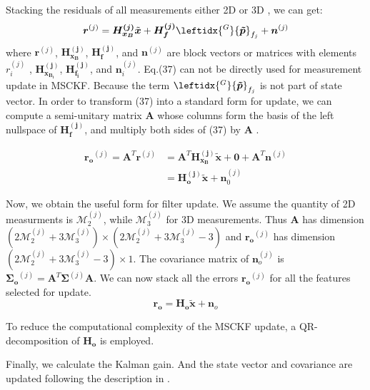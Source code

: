 \documentclass[a4paper, 10pt, conference]{ieeeconf}      %
\begin{document}
Stacking the residuals
of all measurements either 2D or 3D , we can get:
\begin{equation}
\bm {r}^{(j)} =\bm{H_{x_{B}}^{(j)}}{\tilde {\bm x}}+\bm{H_{f}^{(j)}}{\leftidx{^{G}}{\bm {\tilde p}}_{f_{j}}}+{\bm n^{(j)}}
\end{equation}
where $ \bm {r}^{(j)} $, $ \bm{H_{x_{B}}^{(j)}} $, $ \bm{H_{f}^{(j)}} $, and $ {\bm n^{(j)}} $ are block vectors or matrices with elements $ {r}_i^{(j)} $ , $ \bm{H_{x_{B_i}}^{(j)}} $, $ \bm{H_{f_{i}}^{(j)}} $, and $ {\bm n_i^{(j)}} $. Eq.(37) can not be directly used for measurement update in MSCKF. Because the term $ {\leftidx{^{G}}{\bm {\tilde p}}_{f_{j}}} $ is not part of state vector. In order to transform (37) into a standard form for update, we can compute a semi-unitary matrix $ \bm A $ whose columns form
the basis of the left nullspace of $ \bm{H_{f}^{(j)}} $, and multiply both sides of (37) by $ \bm A $ \cite{mourikis2007multi} .

\begin{equation}
\begin{split}
\bm {r_o}^{(j)} = \bm A^T\bm {r}^{(j)} & =\bm A^T \bm{H_{x_{B}}^{(j)}}{\tilde {\bm x}}+\bm 0+ \bm A^T{\bm n^{(j)}} \\
& = \bm{H_{o}^{(j)}}{\tilde {\bm x}} + {\bm n_0^{(j)}}
\end{split}
\end{equation}

Now, we obtain the useful form for filter update. We assume the quantity of 2D measurments is $\mathcal M_2^{(j)}$, while $\mathcal M_3^{(j)}$ for 3D measurements. Thus $ \bm A $ has dimension $  (2 \mathcal  M_2^{(j)} + 3 \mathcal  M_3^{(j)} ) \times
(2 \mathcal  M_2^{(j)} + 3 \mathcal  M_3^{(j)} -3)  $ and  $ \bm {r_o}^{(j)}  $ has dimension $ (2 \mathcal  M_2^{(j)} + 3 \mathcal  M_3^{(j)} -3) \times 1 $. The
covariance matrix of $ {\bm n_o^{(j)}} $ is  $ \bm { \Sigma_o}^{(j)}  = \bm A^T{\bm \Sigma^{(j)}}\bm A $.
We can now stack all the errors $ \bm {r_o}^{(j)}  $ for all the features selected for update.
\begin{equation}
\bm {r_o}= \bm{H_o}{\tilde {\bm x}} + {\bm n_o}
\end{equation}

To reduce the
computational complexity of the MSCKF update, a QR-decomposition of $ \bm{H_o} $ is employed.
 
Finally, we calculate the Kalman gain. And the state vector and covariance are updated following the  description in \cite{mourikis2007multi}.
\end{document}
